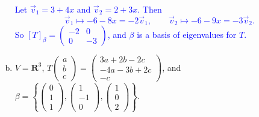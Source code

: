 \documentclass[a4paper,11pt]{article}
\newcommand{\R}{\mathbf{R}}
\newcommand{\blue}[1]{\textcolor{blue}{#1}}
\begin{document}
\begin{enumerate}[(a)]
  \blue{Let $\vec v_1=3+4x$ and $\vec v_2=2+3x$. Then
    \[
      \vec v_1 \mapsto -6-8x = -2\vec v_1, \qquad
      \vec v_2 \mapsto -6-9x = -3\vec v_2.
    \]
    So $[T]_\beta = \left( \begin{smallmatrix}-2&0\\0&-3\end{smallmatrix}
    \right)$, and $\beta$ is a basis of eigenvalues for $T$. \\}
  
\item $V=\R^3$,
  $T\left( \begin{smallmatrix}a\\b\\c\end{smallmatrix} \right)=
  \left( \begin{smallmatrix}3a+2b-2c\\-4a-3b+2c\\-c\end{smallmatrix} \right)$,
  and
  $\beta=\left\{ \left( \begin{smallmatrix}0\\1\\1\end{smallmatrix} \right),
    \left( \begin{smallmatrix}1\\-1\\0\end{smallmatrix} \right),
    \left( \begin{smallmatrix}1\\0\\2\end{smallmatrix} \right)\right\}$. \\


\end{enumerate}
\end{document}
